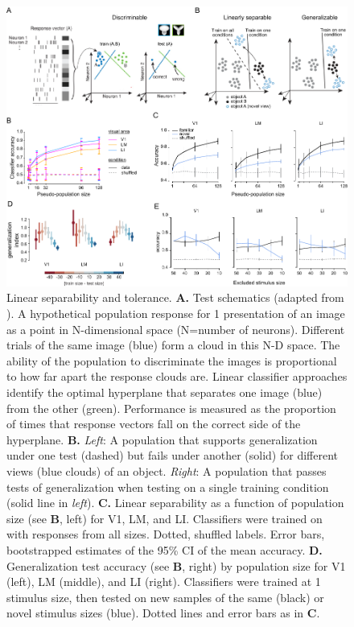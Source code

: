 \begin{figure}[t!]
    \includegraphics[width=\textwidth]{figures/chapter_4/fig_4-4_neural_generalization/fig_4-4_neural_generalization.pdf}
    \vspace{.1in}
    \caption[Population representations of objects]{Linear separability and tolerance. 
    \textbf{A.} Test schematics (adapted from \cite{Rust2010SelectivityIT}). A hypothetical population response for 1 presentation of an image as a point in N-dimensional space (N=number of neurons). Different trials of the same image (blue) form a cloud in this N-D space. The ability of the population to discriminate the images is proportional to how far apart the response clouds are. Linear classifier approaches identify the optimal hyperplane that separates one image (blue) from the other (green). Performance is measured as the proportion of times that response vectors fall on the correct side of the hyperplane. 
    \textbf{B.} \textit{Left}: A population that supports generalization under one test (dashed) but fails under another (solid) for different views (blue clouds) of an object. \textit{Right}: A population that passes tests of generalization when testing on a single training condition (solid line in \textit{left}).
    \textbf{C.} Linear separability as a function of population size (see \textbf{B}, left) for V1, LM, and LI. Classifiers were trained on with responses from all sizes. Dotted, shuffled labels. Error bars, bootstrapped estimates of the 95\% CI of the mean accuracy. 
    \textbf{D.} Generalization test accuracy (see \textbf{B}, right) by population size for V1 (left), LM (middle), and LI (right). Classifiers were trained at 1 stimulus size, then tested on new samples of the same (black) or novel stimulus sizes (blue). Dotted lines and error bars as in \textbf{C}.
}
\end{figure}
